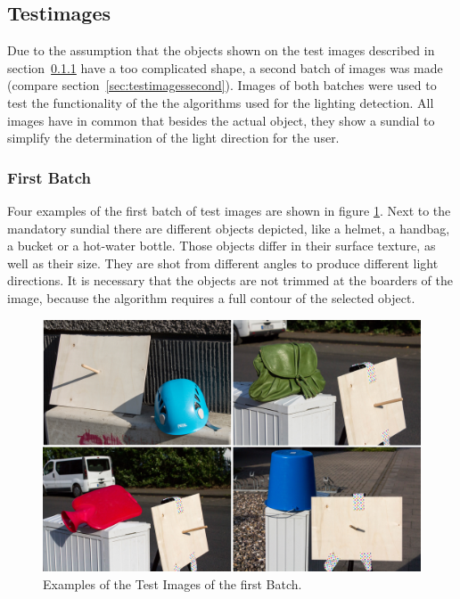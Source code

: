 \subsection{Testimages} \label{sec:testimages}
Due to the assumption that the objects shown on the test images described in section~\ref{sec:testimagesfirst} have a too complicated shape, a second batch of images was made (compare section~\ref{sec:testimagessecond}). Images of both batches were used to test the functionality of the the algorithms used for the lighting detection. All images have in common that besides the actual object, they show a sundial to simplify the determination of the light direction for the user.


\subsubsection{First Batch} \label{sec:testimagesfirst}
Four examples of the first batch of test images are shown in figure \ref{fig:batch1}. Next to the mandatory sundial there are different objects depicted, like a helmet, a handbag, a bucket or a hot-water bottle. Those objects differ in their surface texture, as well as their size. They are shot from different angles to produce different light directions. It is necessary that the objects are not trimmed at the boarders of the image, because the algorithm requires a full contour of the selected object.


\begin{figure}[H] 
	\center 
	\includegraphics[width=12cm]{Images/batch1.jpg}			
	\caption[Examples of the Test Images of the first Batch.]{Examples of the Test Images of the first Batch.}
	\label{fig:batch1}
\end{figure}

